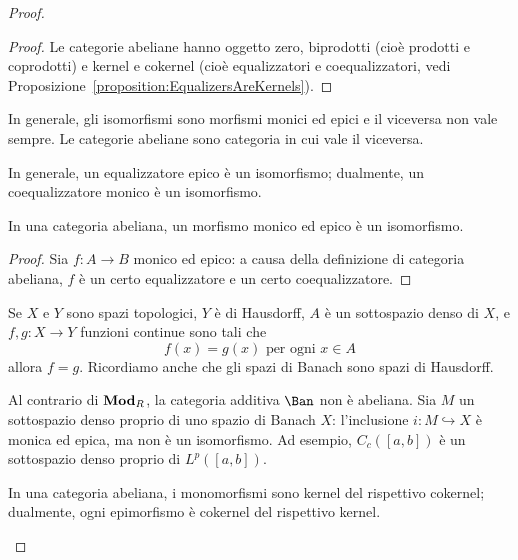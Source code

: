 \begin{proof}
\begin{proof}
  Le categorie abeliane hanno oggetto zero, biprodotti (cioè prodotti e
  coprodotti) e kernel e cokernel (cioè equalizzatori e coequalizzatori,
  vedi Proposizione~\ref{proposition:EqualizersAreKernels}).
\end{proof}

In generale, gli isomorfismi sono morfismi monici ed epici e il
viceversa non vale sempre. Le categorie abeliane sono categoria in cui
vale il viceversa.

\begin{recall}
  In generale, un equalizzatore epico è un isomorfismo; dualmente, un
  coequalizzatore monico è un isomorfismo.
\end{recall}

\begin{proposition}
  In una categoria abeliana, un morfismo monico ed epico è un
  isomorfismo.
\end{proposition}

\begin{proof}
  Sia \(f : A \to B\) monico ed epico: a causa della definizione di
  categoria abeliana, \(f\) è un certo equalizzatore e un certo
  coequalizzatore.
\end{proof}

\begin{recall}
  Se \(X\) e \(Y\) sono spazi topologici, \(Y\) è di Hausdorff, \(A\) è
  un sottospazio denso di \(X\), e \(f, g : X \to Y\) funzioni continue
  sono tali che
  \[
    f(x) = g(x) \text{ per ogni } x \in A
  \]
  allora \(f = g\). Ricordiamo anche che gli spazi di Banach sono spazi
  di Hausdorff.
\end{recall}

\begin{example}
  Al contrario di \(\mathbf{Mod}_R\), la categoria additiva \(\Ban\) non è
  abeliana. Sia \(M\) un sottospazio denso proprio di uno spazio di
  Banach \(X\): l'inclusione \(i : M \hookrightarrow X\) è monica ed epica, ma non è
  un isomorfismo. Ad esempio, \(C_c([a, b])\) è un sottospazio denso proprio di
  \(L^p([a, b])\).
\end{example}

\begin{proposition}\label{proposition:MonoIsKerOfItsCoker} 
  In una categoria abeliana, i monomorfismi sono kernel del rispettivo
  cokernel; dualmente, ogni epimorfismo è cokernel del rispettivo kernel.
\end{proposition}


\end{proof}
